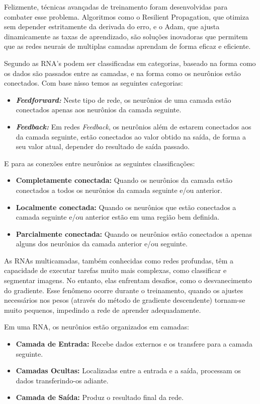 \documentclass[conference]{IEEEtran}
\begin{document}
Felizmente, técnicas avançadas de treinamento foram desenvolvidas para combater esse problema. 
Algoritmos como o Resilient Propagation, que otimiza sem depender estritamente da derivada do erro, 
e o Adam, que ajusta dinamicamente as taxas de aprendizado, são soluções inovadoras que permitem que 
as redes neurais de multiplas camadas aprendam de forma eficaz e eficiente.\cite{braga2016redes}

Segundo \cite{faceli2022inteligencia} as RNA's podem ser classificadas em categorias, baseado na 
forma como os dados são passados entre as camadas, e na forma como os neurônios estão conectados. 
Com base nisso temos as seguintes categorias:
\begin{itemize}
    \item {\emph{\textbf{Feedforward:}}}
    Neste tipo de rede, os neurônios de uma camada estão conectados apenas aos neurônios da camada seguinte.
    \item {\emph{\textbf{Feedback:}}}
    Em redes \emph{Feedback}, os neurônios além de estarem conectados aos da camada seguinte, estão 
    conectados ao valor obtido na saída, de forma a seu valor atual, depender do resultado de saída passado.
\end{itemize}

E para as conexões entre neurônios as seguintes classificações:
\begin{itemize}
    \item {\textbf{Completamente conectada:}}
    Quando os neurônios da camada estão conectados a todos os neurônios da camada seguinte e/ou anterior.
    \item {\textbf{Localmente conectada:}}
    Quando os neurônios que estão conectados a camada seguinte e/ou anterior estão em uma região bem definida.
    \item {\textbf{Parcialmente conectada:}}
    Quando os neurônios estão conectados a apenas alguns dos neurônios da camada anterior e/ou seguinte.
\end{itemize}

As RNAs multicamadas, também conhecidas como redes profundas, têm a capacidade de executar tarefas 
muito mais complexas, como classificar e segmentar imagens. No entanto, elas enfrentam desafios, 
como o desvanecimento do gradiente. Esse fenômeno ocorre durante o treinamento, quando os ajustes 
necessários nos pesos (através do método de gradiente descendente) tornam-se muito pequenos, 
impedindo a rede de aprender adequadamente.

Em uma RNA, os neurônios estão organizados em camadas:
\begin{itemize}
    \item {\textbf{Camada de Entrada:}} Recebe dados externos e os transfere para a camada seguinte.

    \item {\textbf{Camadas Ocultas:}} Localizadas entre a entrada e a saída, processam os dados 
    transferindo-os adiante.
    
    \item {\textbf{Camada de Saída:}} Produz o resultado final da rede.
\end{itemize}
\end{document}
